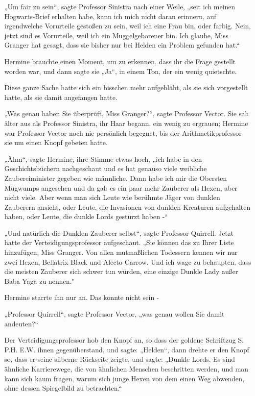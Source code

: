 {„Um fair zu sein“, sagte Professor Sinistra nach einer Weile, „seit ich meinen Hogwarts-Brief erhalten habe, kann ich mich nicht daran erinnern, auf irgendwelche Vorurteile gestoßen zu sein, weil ich eine Frau bin, oder farbig. Nein, jetzt sind es Vorurteile, weil ich ein Muggelgeborener bin. Ich glaube, Miss Granger hat gesagt, dass sie bisher nur bei Helden ein Problem gefunden hat.“

Hermine brauchte einen Moment, um zu erkennen, dass ihr die Frage gestellt worden war, und dann sagte sie „Ja“, in einem Ton, der ein wenig quietschte.

Diese ganze Sache hatte sich ein bisschen mehr aufgebläht, als sie sich vorgestellt hatte, als sie damit angefangen hatte.

„Was genau haben Sie überprüft, Miss Granger?“, sagte Professor Vector. Sie sah älter aus als Professor Sinistra, ihr Haar begann, ein wenig zu ergrauen; Hermine war Professor Vector noch nie persönlich begegnet, bis der Arithmetikprofessor sie um einen Knopf gebeten hatte.

„Ähm“, sagte Hermine, ihre Stimme etwas hoch, „ich habe in den Geschichtsbüchern nachgeschaut und es hat genauso viele weibliche Zaubereiminister gegeben wie männliche. Dann habe ich mir die Obersten Mugwumps angesehen und da gab es ein paar mehr Zauberer als Hexen, aber nicht viele. Aber wenn man sich Leute wie berühmte Jäger von dunklen Zauberern ansieht, oder Leute, die Invasionen von dunklen Kreaturen aufgehalten haben, oder Leute, die dunkle Lords gestürzt haben -“

„Und natürlich die Dunklen Zauberer selbst“, sagte Professor Quirrell. Jetzt hatte der Verteidigungsprofessor aufgeschaut. „Sie können das zu Ihrer Liste hinzufügen, Miss Granger. Von allen mutmaßlichen Todessern kennen wir nur zwei Hexen, Bellatrix Black und Alecto Carrow. Und ich wage zu behaupten, dass die meisten Zauberer sich schwer tun würden, eine einzige Dunkle Lady außer Baba Yaga zu nennen."

Hermine starrte ihn nur an. Das konnte nicht sein -

„Professor Quirrell“, sagte Professor Vector, „was genau wollen Sie damit andeuten?“

Der Verteidigungsprofessor hob den Knopf an, so dass der goldene Schriftzug S. P.H. E.W. ihnen gegenüberstand, und sagte: „Helden“, dann drehte er den Knopf so, dass er seine silberne Rückseite zeigte, und sagte: „Dunkle Lords. Es sind ähnliche Karrierewege, die von ähnlichen Menschen beschritten werden, und man kann sich kaum fragen, warum sich junge Hexen von dem einen Weg abwenden, ohne dessen Spiegelbild zu betrachten.“

}
